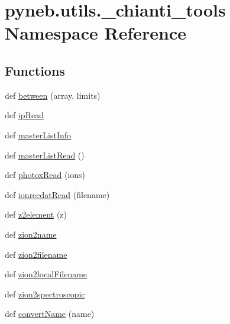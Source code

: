 \hypertarget{namespacepyneb_1_1utils_1_1__chianti__tools}{}\section{pyneb.\+utils.\+\_\+chianti\+\_\+tools Namespace Reference}
\label{namespacepyneb_1_1utils_1_1__chianti__tools}
\subsection*{Functions}
\begin{DoxyCompactItemize}
\item 
def \hyperlink{namespacepyneb_1_1utils_1_1__chianti__tools_a46b8e5a174144ca33b476e2ea883403a}{between} (array, limits)
\item 
def \hyperlink{namespacepyneb_1_1utils_1_1__chianti__tools_addc139edf6069387aed0049344002b13}{ip\+Read}
\item 
def \hyperlink{namespacepyneb_1_1utils_1_1__chianti__tools_a5677fc0d50bd22a853c14b4b2606b89e}{master\+List\+Info}
\item 
def \hyperlink{namespacepyneb_1_1utils_1_1__chianti__tools_a1a4447320a9d614f994bc538890c32cd}{master\+List\+Read} ()
\item 
def \hyperlink{namespacepyneb_1_1utils_1_1__chianti__tools_ac5c830808b3221d5f11b3e2d83b6140d}{photox\+Read} (ions)
\item 
def \hyperlink{namespacepyneb_1_1utils_1_1__chianti__tools_a552566dde90c6b3d2d8e934914d3ae76}{ionrecdat\+Read} (filename)
\item 
def \hyperlink{namespacepyneb_1_1utils_1_1__chianti__tools_a0e092ff402fc0287bcaaed67171934ea}{z2element} (z)
\item 
def \hyperlink{namespacepyneb_1_1utils_1_1__chianti__tools_a7d6debb5f68b52f64c311ca1fe99945c}{zion2name}
\item 
def \hyperlink{namespacepyneb_1_1utils_1_1__chianti__tools_a46370e972711f8737755fa9c8fb57ed8}{zion2filename}
\item 
def \hyperlink{namespacepyneb_1_1utils_1_1__chianti__tools_aa1c272dcccda8670d22cf866cd0e9b5f}{zion2local\+Filename}
\item 
def \hyperlink{namespacepyneb_1_1utils_1_1__chianti__tools_a4c5a7ace6a222c4cfad8f00cf2b68554}{zion2spectroscopic}
\item 
def \hyperlink{namespacepyneb_1_1utils_1_1__chianti__tools_a92cf299ad3407ee8923739e2761ab13f}{convert\+Name} (name)

\end{DoxyCompactItemize}
